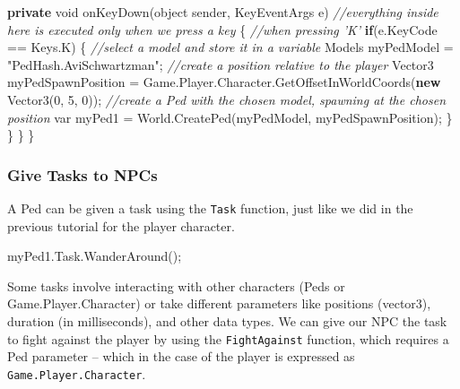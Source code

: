 \documentclass[
  openany]{book}
\newenvironment{Shaded}{\begin{snugshade}}{\end{snugshade}}
\newcommand{\CommentTok}[1]{\textcolor[rgb]{0.56,0.35,0.01}{\textit{#1}}}
\newcommand{\DataTypeTok}[1]{\textcolor[rgb]{0.13,0.29,0.53}{#1}}
\newcommand{\DecValTok}[1]{\textcolor[rgb]{0.00,0.00,0.81}{#1}}
\newcommand{\FunctionTok}[1]{\textcolor[rgb]{0.00,0.00,0.00}{#1}}
\newcommand{\KeywordTok}[1]{\textcolor[rgb]{0.13,0.29,0.53}{\textbf{#1}}}
\newcommand{\NormalTok}[1]{#1}
\newcommand{\StringTok}[1]{\textcolor[rgb]{0.31,0.60,0.02}{#1}}
\begin{document}
\begin{Shaded}
\begin{Highlighting}[]
        \KeywordTok{private} \DataTypeTok{void} \FunctionTok{onKeyDown}\NormalTok{(}\DataTypeTok{object}\NormalTok{ sender, KeyEventArgs e) }\CommentTok{//everything inside here is executed only when we press a key}
\NormalTok{        \{}
            \CommentTok{//when pressing 'K'}
            \KeywordTok{if}\NormalTok{(e.}\FunctionTok{KeyCode}\NormalTok{ == Keys.}\FunctionTok{K}\NormalTok{)}
\NormalTok{            \{}
                \CommentTok{//select a model and store it in a variable}
\NormalTok{                Models myPedModel = }\StringTok{"PedHash.AviSchwartzman"}\NormalTok{;}
        \CommentTok{//create a position relative to the player}
\NormalTok{        Vector3 myPedSpawnPosition = Game.}\FunctionTok{Player}\NormalTok{.}\FunctionTok{Character}\NormalTok{.}\FunctionTok{GetOffsetInWorldCoords}\NormalTok{(}\KeywordTok{new} \FunctionTok{Vector3}\NormalTok{(}\DecValTok{0}\NormalTok{, }\DecValTok{5}\NormalTok{, }\DecValTok{0}\NormalTok{));}
        \CommentTok{//create a Ped with the chosen model, spawning at the chosen position}
        \DataTypeTok{var}\NormalTok{ myPed1 = World.}\FunctionTok{CreatePed}\NormalTok{(myPedModel, myPedSpawnPosition); }
\NormalTok{            \}}
\NormalTok{        \}}
\NormalTok{    \}}
\NormalTok{\}}
\end{Highlighting}
\end{Shaded}

\hypertarget{give-tasks-to-npcs}{%
\subsubsection*{Give Tasks to NPCs}\label{give-tasks-to-npcs}}

A Ped can be given a task using the \texttt{Task} function, just like we did in the previous tutorial for the player character.

\begin{Shaded}
\begin{Highlighting}[]
\NormalTok{myPed1.}\FunctionTok{Task}\NormalTok{.}\FunctionTok{WanderAround}\NormalTok{();}
\end{Highlighting}
\end{Shaded}

Some tasks involve interacting with other characters (Peds or Game.Player.Character) or take different parameters like positions (vector3), duration (in milliseconds), and other data types.
We can give our NPC the task to fight against the player by using the \texttt{FightAgainst} function, which requires a Ped parameter -- which in the case of the player is expressed as \texttt{Game.Player.Character}.
\end{document}
